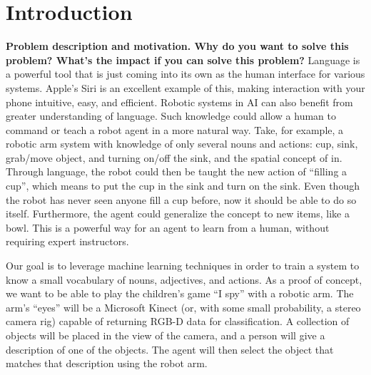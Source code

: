 \documentclass[11pt]{article}
\title{\xxx{Linguistic Classification of Objects}}
\author{Rob Goeddel \and Lauren Hinkle \and James Kirk \and Aaron Mininger}
\date{}
\newcommand{\xxx}[1]{{\bf \color{red} #1}}
\begin{document}
\maketitle

\begin{abstract}
\xxx{Abstract goes here, 1 par. max}
Interaction between robots and humans is a rapidly growing area of reasearch.  Inorder for a robot to effectively interact with a human, it needs to be able to understand human descriptions of objects within its environment.  In a simple ``I Spy'' game the basic concepts of learning features of objects can be demonstrated in an interactive way between two parties. \xxx{moar}
Dijkstra was a cool guy and it's fun to cite his papers~\cite{dijkstra1959}. (It's true)
\end{abstract}

\section{Introduction}
\xxx{Problem description and motivation. Why do you want to solve this
    problem? What's the impact if you can solve this problem?}
Language is a powerful tool that is just coming into its own as the human
interface for various systems. Apple's Siri is an excellent example of this, making interaction with your phone intuitive, easy, and efficient. Robotic systems in AI can also benefit from greater understanding of
language. Such knowledge could allow a human to command or teach a robot agent in a more natural way. Take, for example, a robotic arm system with knowledge of only
several nouns and actions: cup, sink, grab/move object, and turning on/off
the sink, and the spatial concept of in. Through language, the robot could then be taught the new action of ``filling a cup'', which means to put the cup in the sink and turn on the
sink. Even though the robot has never seen anyone fill a cup before, now
it should be able to do so itself. Furthermore, the agent could generalize the concept to new items, like a bowl. This is a powerful
way for an agent to learn from a human, without requiring expert instructors. 

Our goal is to leverage machine learning techniques in order to train a system to know a small vocabulary of nouns, adjectives,
and actions. As a proof of concept, we want to be able to play the children's
game ``I spy'' with a robotic arm. The arm's ``eyes'' will be a Microsoft
Kinect (or, with some small probability, a stereo camera rig) capable of
returning RGB-D data for classification. A collection of objects will be placed in the view of the camera, and a person will give a description of one of the objects. The agent will then select the object that matches that description using the robot arm.
\end{document}
